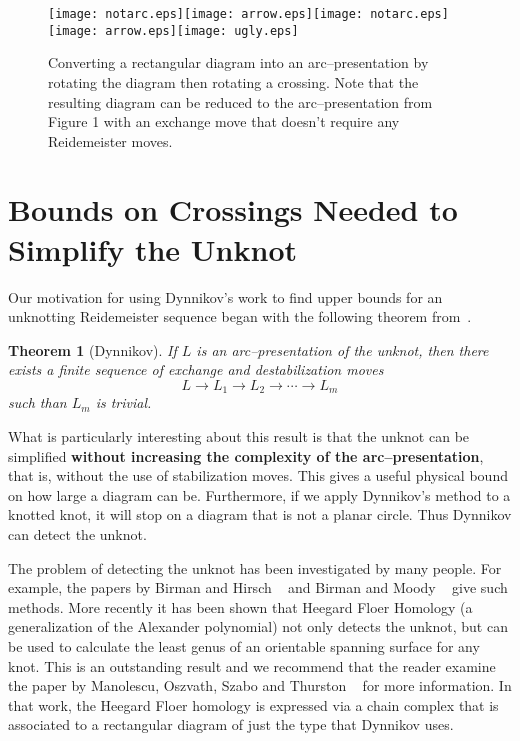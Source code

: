 \documentclass{amsart}
\newtheorem{theorem}{Theorem}
\begin{document}
\begin{figure}[h]
\begin{center}
\texttt{[image: notarc.eps]}\texttt{[image: arrow.eps]}\texttt{[image: notarc.eps]}\texttt{[image: arrow.eps]}\texttt{[image: ugly.eps]}
\end{center}
\caption{ \small{Converting a rectangular diagram into an arc--presentation by rotating the diagram then rotating a crossing. Note that the resulting diagram can be reduced to the arc--presentation from Figure 1 with an exchange move that doesn't require any Reidemeister moves.}}
\label{morse}
\end{figure}

\section{Bounds on Crossings Needed to Simplify the Unknot}

Our motivation for using Dynnikov's work to find upper bounds for an unknotting Reidemeister sequence began with the following theorem from~\cite{dynnikov}.

\begin{theorem}[Dynnikov]\label{triv}
If $L$ is an arc--presentation of the unknot, then there exists a finite sequence of exchange and destabilization moves $$L\rightarrow L_1\rightarrow L_2\rightarrow
\cdots\rightarrow L_m$$ such than $L_m$ is trivial.\end{theorem}

What is particularly interesting about this result is that the unknot can be simplified \textbf{without increasing the complexity of the arc--presentation}, that is, without the use of stabilization moves. 
This gives a useful physical bound on how large a diagram can be. Furthermore, if we apply Dynnikov's
method to a knotted knot, it will stop on a diagram that is not a planar circle. Thus Dynnikov can
detect the unknot. 
\bigbreak

The problem of detecting the unknot has been investigated by many people. 
For example, the papers by Birman and Hirsch ~\cite{Alg}  and Birman and Moody ~\cite{Obstr} give such methods. More recently it has been shown that Heegard Floer Homology (a generalization of 
the Alexander polynomial) not only detects the unknot, but can be used to calculate the least genus of
an orientable spanning surface for any knot. This is an outstanding result and we recommend that the 
reader examine the paper by Manolescu, Oszvath, Szabo and Thurston ~\cite{Heegard} for more information. In that work, the Heegard Floer homology is expressed via a chain complex that is associated to a rectangular  diagram of just the type that Dynnikov uses. 
\bigbreak
\end{document}
